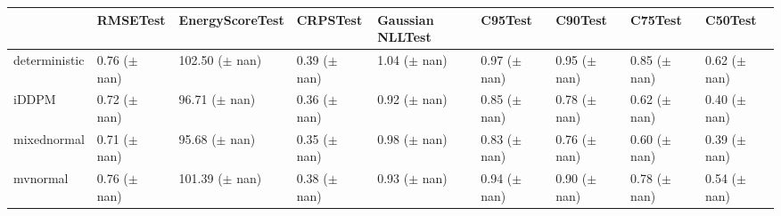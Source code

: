 \begin{tabular}{lllllllll}
\toprule
 & RMSETest & EnergyScoreTest & CRPSTest & Gaussian NLLTest & C95Test & C90Test & C75Test & C50Test \\
\midrule
deterministic & \makecell{0.76 \\ ($\pm$ nan)} & \makecell{102.50 \\ ($\pm$ nan)} & \makecell{0.39 \\ ($\pm$ nan)} & \makecell{1.04 \\ ($\pm$ nan)} & \makecell{0.97 \\ ($\pm$ nan)} & \makecell{0.95 \\ ($\pm$ nan)} & \makecell{0.85 \\ ($\pm$ nan)} & \makecell{0.62 \\ ($\pm$ nan)} \\
iDDPM & \makecell{0.72 \\ ($\pm$ nan)} & \makecell{96.71 \\ ($\pm$ nan)} & \makecell{0.36 \\ ($\pm$ nan)} & \makecell{0.92 \\ ($\pm$ nan)} & \makecell{0.85 \\ ($\pm$ nan)} & \makecell{0.78 \\ ($\pm$ nan)} & \makecell{0.62 \\ ($\pm$ nan)} & \makecell{0.40 \\ ($\pm$ nan)} \\
mixednormal & \makecell{0.71 \\ ($\pm$ nan)} & \makecell{95.68 \\ ($\pm$ nan)} & \makecell{0.35 \\ ($\pm$ nan)} & \makecell{0.98 \\ ($\pm$ nan)} & \makecell{0.83 \\ ($\pm$ nan)} & \makecell{0.76 \\ ($\pm$ nan)} & \makecell{0.60 \\ ($\pm$ nan)} & \makecell{0.39 \\ ($\pm$ nan)} \\
mvnormal & \makecell{0.76 \\ ($\pm$ nan)} & \makecell{101.39 \\ ($\pm$ nan)} & \makecell{0.38 \\ ($\pm$ nan)} & \makecell{0.93 \\ ($\pm$ nan)} & \makecell{0.94 \\ ($\pm$ nan)} & \makecell{0.90 \\ ($\pm$ nan)} & \makecell{0.78 \\ ($\pm$ nan)} & \makecell{0.54 \\ ($\pm$ nan)} \\

\end{tabular}
